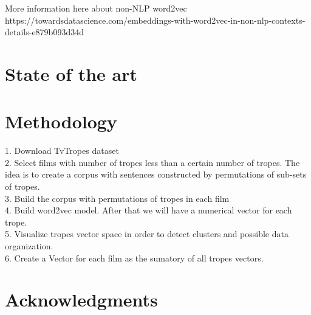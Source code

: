 \documentclass[letterpaper]{article}
\begin{document}
   








More information here about non-NLP word2vec
https://towardsdatascience.com/embeddings-with-word2vec-in-non-nlp-contexts-details-e879b093d34d

\section{State of the art}

\section{Methodology}

1. Download TvTropes dataset \\
2. Select films with number of tropes less than a certain number of tropes. The idea is to create a corpus with sentences constructed by permutations of sub-sets of tropes. \\
3. Build the corpus with permutations of tropes in each film \\
4. Build word2vec model. After that we will have a numerical vector for each trope. \\
5. Visualize tropes vector space in order to detect clusters and possible data organization. \\ 
6. Create a Vector for each film as the sumatory of all tropes vectors. \\

 


\section{Acknowledgments}




\end{document}
